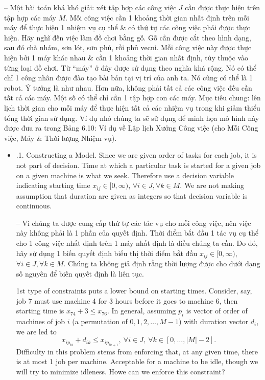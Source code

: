 \documentclass{article}
\begin{document}
\begin{itemize}
\begin{itemize}
        -- Một bài toán khá khó giải: xét tập hợp các công việc $J$ cần được thực hiện trên tập hợp các máy $M$. Mỗi công việc cần 1 khoảng thời gian nhất định trên mỗi máy để thực hiện 1 nhiệm vụ cụ thể \& có thứ tự các công việc phải được thực hiện. Hãy nghĩ đến việc làm đồ chơi bằng gỗ. Gỗ cần được cắt theo hình dạng, sau đó chà nhám, sơn lót, sơn phủ, rồi phủ vecni. Mỗi công việc này được thực hiện bởi 1 máy khác nhau \& cần 1 khoảng thời gian nhất định, tùy thuộc vào từng loại đồ chơi. Từ ``máy'' ở đây được sử dụng theo nghĩa khá rộng. Nó có thể chỉ 1 công nhân được đào tạo bài bản tại vị trí của anh ta. Nó cũng có thể là 1 robot. Ý tưởng là như nhau. Hơn nữa, không phải tất cả các công việc đều cần tất cả các máy. Một số có thể chỉ cần 1 tập hợp con các máy. Mục tiêu chung: lên lịch thời gian cho mỗi máy để thực hiện tất cả các nhiệm vụ trong khi giảm thiểu tổng thời gian sử dụng. Ví dụ nhỏ chúng ta sẽ sử dụng để minh họa mô hình này được đưa ra trong {\sf Bảng 6.10: Ví dụ về Lập lịch Xưởng Công việc (cho Mỗi Công việc, Máy \& Thời lượng Nhiệm vụ).}
        \begin{itemize}
            \item {.1. Constructing a Model.} Since we are given order of tasks for each job, it is not part of decision. Time at which a particular task is started for a given job on a given machine is what we seek. Therefore use a decision variable indicating starting time $x_{ij}\in[0,\infty)$, $\forall i\in J,\forall k\in M$. We are not making assumption that duration are given as integers so that decision variable is continuous.

            -- Vì chúng ta được cung cấp thứ tự các tác vụ cho mỗi công việc, nên việc này không phải là 1 phần của quyết định. Thời điểm bắt đầu 1 tác vụ cụ thể cho 1 công việc nhất định trên 1 máy nhất định là điều chúng ta cần. Do đó, hãy sử dụng 1 biến quyết định biểu thị thời điểm bắt đầu $x_{ij}\in[0,\infty)$, $\forall i\in J,\forall k\in M$. Chúng ta không giả định rằng thời lượng được cho dưới dạng số nguyên để biến quyết định là liên tục.

            1st type of constraints puts a lower bound on starting times. Consider, say, job 7 must use machine 4 for 3 hours before it goes to machine 6, then starting time is $x_{74} + 3\le x_{76}$. In general, assuming $p_i$ is vector of order of machines of job $i$ (a permutation of $0,1,2,\ldots,M - 1$) with duration vector $d_i$, we are led to
            \begin{equation*}
                x_{ip_{ik}} + d_{ik}\le x_{ip_{ik + 1}},\ \forall i\in J,\ \forall k\in[0,\ldots,|M| - 2].
            \end{equation*}
            Difficulty in this problem stems from enforcing that, at any given time, there is at most 1 job per machine. Acceptable for a machine to be idle, though we will try to minimize idleness. Howe can we enforce this constraint?


\end{itemize}
\end{itemize}
\end{itemize}
\end{document}

